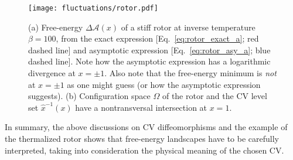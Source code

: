 \begin{subappendices}
%
\begin{figure}
  \begin{center}
    \texttt{[image: fluctuations/rotor.pdf]}
  \end{center}
  \caption{
    (a) Free-energy $\Delta \mathscr{A}(x)$ of a stiff rotor at inverse temperature $\beta = 100$, from the exact expression [Eq.~\eqref{eq:rotor_exact_a}; red dashed line] and asymptotic expression [Eq.~\eqref{eq:rotor_asy_a}; blue dashed line].
    Note how the asymptotic expression has a logarithmic divergence at $x = \pm 1$.
    Also note that the free-energy minimum is \emph{not} at $x = \pm 1$ as one might guess (or how the asymptotic expression suggests).
    (b) Configuration space $\Omega$ of the rotor and the CV level set $\hat{x}^{-1}(x)$ have a nontransversal intersection at $x = 1$.
  }
  \label{fig:rotor}
\end{figure}

\smallbreak
In summary, the above discussions on CV diffeomorphisms and the example of the thermalized rotor shows that free-energy landscapes have to be carefully interpreted, taking into consideration the physical meaning of the chosen CV.

\end{subappendices}
